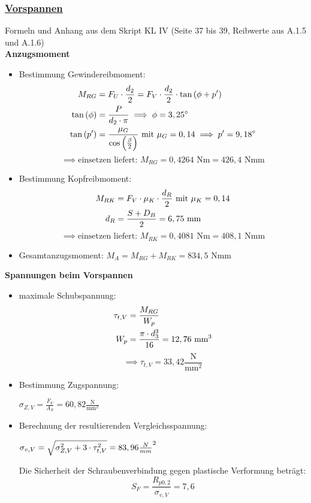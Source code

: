 \subsubsection{\underline{Vorspannen}}
Formeln und Anhang aus dem Skript KL IV  (Seite 37 bis 39, Reibwerte aus A.1.5 und A.1.6) \\
\textbf{Anzugsmoment}\\
\begin{itemize}
		\item Bestimmung Gewindereibmoment: 
		\begin{align*}
		M_{RG} &= F_U \cdot \frac{d_2}{2} = F_V\cdot \frac{d_2}{2}\cdot \tan\left(\phi + p'\right)\\
		\tan\left(\phi\right) &= \frac{P}{d_2 \cdot \pi}\implies \phi = 3,25^{\circ}\\
		\tan\left(p'\right) &= \frac{\mu_G}{\cos\left(\frac{\beta}{2}\right)} \text{ mit } \mu_G = 0,14 \implies p' = 9,18^{\circ}
		\end{align*}
		\[\implies \text{einsetzen liefert: }  M_{RG} =0,4264 \text{ Nm} = 426,4\text{ Nmm}\]
			
		\item Bestimmung Kopfreibmoment:
		\begin{align*}
		M_{RK}&= F_V\cdot \mu_K\cdot \frac{d_R}{2} \text{ mit }\mu_K = 0,14\\
		d_R &= \frac{S+D_B}{2} = 6,75 \text{ mm}
		\end{align*}
		\[\implies \text{einsetzen liefert: }  M_{RK} = 0,4081 \text{ Nm} = 408,1\text{ Nmm} \]
		
		\item Gesamtanzugsmoment:
	$M_A = M_{RG} + M_{RK} = 834,5 \text{ Nmm}$
\end{itemize}
\newpage
\textbf{Spannungen beim Vorspannen}
\begin{itemize}
	\item maximale Schubspannung:
	\begin{align*}
		\tau_{t,V} &= \frac{M_{RG}}{W_p}\\
		W_p &= \frac{\pi\cdot d_3^3}{16} = 12,76 \text{ mm}^3
	\end{align*}
	\[\implies \tau_{t,V} = 33,42 \frac{\text{N}}{\text{mm}^2}\]
	\item Bestimmung Zugspannung: \\
	\begin{center} $\sigma_{Z,V} = \frac{F_V}{A_S} = 60,82 \frac{\text{N}}{\text{mm}^2}$\end{center}
	\item Berechnung der resultierenden Vergleichsspannung:\\
	\begin{center}
		$\sigma_{v,V} = \sqrt{\sigma_{Z,V}^2+3\cdot\tau_{t,V}^2} = 83,96 \frac{N}{mm}^2$
	\end{center} 
	Die Sicherheit der Schraubenverbindung gegen plastische Verformung beträgt:\\ 
	\[S_F = \frac{R_{p0,2}}{\sigma_{v,V}} = 7,6\]
\end{itemize}
\newpage
